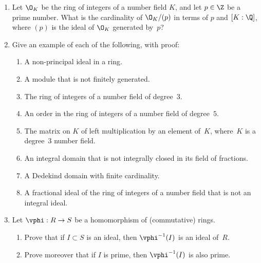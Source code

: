 \begin{enumerate}

\item Let $\O_K$ be the ring of integers of a number field $K$,
and let $p\in\Z$ be a prime number.  What is the cardinality
of $\O_K/(p)$ in terms of $p$ and $[K:\Q]$, 
where $(p)$ is the ideal of $\O_K$ generated by~$p$?

\item Give an example of each of the following, with proof:
\begin{enumerate}
\item A non-principal ideal in a ring.
\item A module that is not finitely generated.
\item The ring of integers of a number field of degree~$3$.
\item An order in the ring of integers of a number field of degree~$5$.
\item The matrix on $K$ of left multiplication by an element of~$K$,
where~$K$ is a degree~$3$ number field.
\item An integral domain that is not integrally closed in its field of fractions.
\item A Dedekind domain with finite cardinality.
\item A fractional ideal of the ring of integers of a number
field that is not an integral ideal.
\end{enumerate}



\item Let $\vphi:R\to S$ be a homomorphism of (commutative) rings.
\begin{enumerate}
\item Prove that if $I\subset S$ is an ideal, then $\vphi^{-1}(I)$
is an ideal of~$R$.
\item Prove moreover that if $I$ is prime, then $\vphi^{-1}(I)$ is
also prime. 
\end{enumerate}


\end{enumerate}

